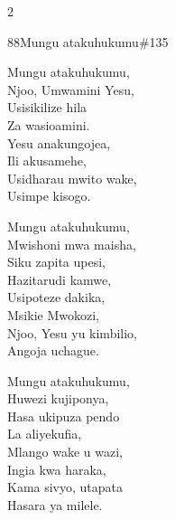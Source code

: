 \documentclass{article}
\begin{document}
\begin{multicols}{2}
\begin{hymn}{88}{Mungu atakuhukumu}{\#135}
\begin{stanza}
Mungu atakuhukumu,\\
Njoo, Umwamini Yesu,\\
Usisikilize hila\\
Za wasioamini.\\
Yesu anakungojea,\\
Ili akusamehe,\\
Usidharau mwito wake,\\
Usimpe kisogo.
\end{stanza}
\begin{stanza}
Mungu atakuhukumu,\\
Mwishoni mwa maisha,\\
Siku zapita upesi,\\
Hazitarudi kamwe,\\
Usipoteze dakika,\\
Msikie Mwokozi,\\
Njoo, Yesu yu kimbilio,\\
Angoja uchague.
\end{stanza}
\begin{stanza}
Mungu atakuhukumu,\\
Huwezi kujiponya,\\
Hasa ukipuza pendo\\
La aliyekufia,\\
Mlango wake u wazi,\\
Ingia kwa haraka,\\
Kama sivyo, utapata\\
Hasara ya milele.
\end{stanza}
\end{hymn}


\end{multicols}
\end{document}
